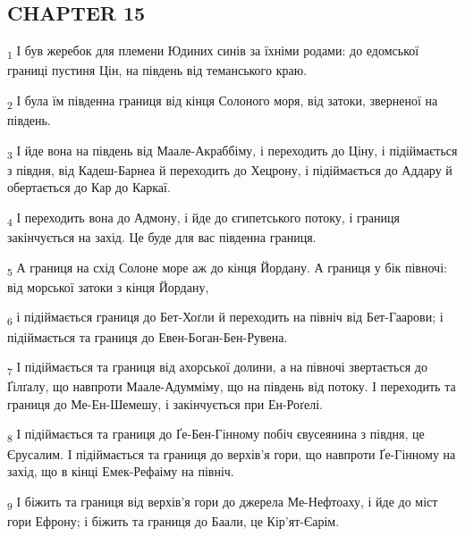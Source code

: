 \subsection{CHAPTER 15}
\begin{tcolorbox}
\textsubscript{1} І був жеребок для племени Юдиних синів за їхніми родами: до едомської границі пустиня Цін, на південь від теманського краю.
\end{tcolorbox}
\begin{tcolorbox}
\textsubscript{2} І була їм південна границя від кінця Солоного моря, від затоки, зверненої на південь.
\end{tcolorbox}
\begin{tcolorbox}
\textsubscript{3} І йде вона на південь від Маале-Акраббіму, і переходить до Ціну, і підіймається з півдня, від Кадеш-Барнеа й переходить до Хецрону, і підіймається до Аддару й обертається до Кар до Каркаї.
\end{tcolorbox}
\begin{tcolorbox}
\textsubscript{4} І переходить вона до Адмону, і йде до єгипетського потоку, і границя закінчується на захід. Це буде для вас південна границя.
\end{tcolorbox}
\begin{tcolorbox}
\textsubscript{5} А границя на схід Солоне море аж до кінця Йордану. А границя у бік півночі: від морської затоки з кінця Йордану,
\end{tcolorbox}
\begin{tcolorbox}
\textsubscript{6} і підіймається границя до Бет-Хоґли й переходить на північ від Бет-Гаарови; і підіймається та границя до Евен-Боган-Бен-Рувена.
\end{tcolorbox}
\begin{tcolorbox}
\textsubscript{7} І підіймається та границя від ахорської долини, а на півночі звертається до Ґілґалу, що навпроти Маале-Адумміму, що на південь від потоку. І переходить та границя до Ме-Ен-Шемешу, і закінчується при Ен-Роґелі.
\end{tcolorbox}
\begin{tcolorbox}
\textsubscript{8} І підіймається та границя до Ґе-Бен-Гінному побіч євусеянина з півдня, це Єрусалим. І підіймається та границя до верхів'я гори, що навпроти Ґе-Гінному на захід, що в кінці Емек-Рефаіму на північ.
\end{tcolorbox}
\begin{tcolorbox}
\textsubscript{9} І біжить та границя від верхів'я гори до джерела Ме-Нефтоаху, і йде до міст гори Ефрону; і біжить та границя до Баали, це Кір'ят-Єарім.
\end{tcolorbox}
